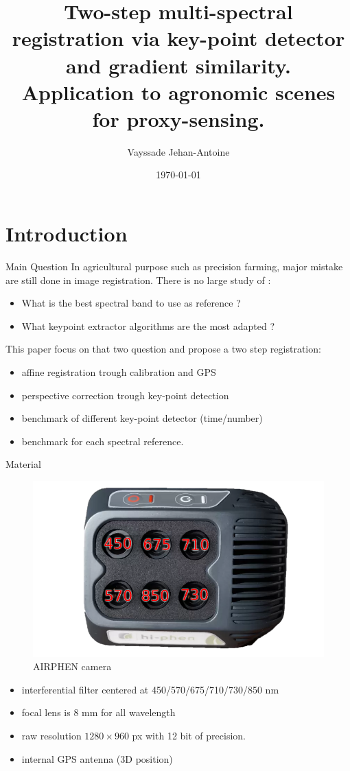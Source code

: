 \documentclass{beamer}
\title{
	Two-step multi-spectral registration via key-point detector and gradient similarity. \\
	\vspace{1em}
	Application to agronomic scenes for proxy-sensing.
}
\date{\today}
\author{Vayssade Jehan-Antoine}
\institute{\url{jehan-antoine.vayssade@inra.fr}}
\begin{document}
	\maketitle
	\section{Introduction}
	
		\begin{frame}{Main Question}
			In agricultural purpose such as precision farming, major mistake are still done in image registration.
			There is no large study of :
			
			\begin{itemize}
				\item What is the best spectral band to use as reference ?
				\item What keypoint extractor algorithms are the most adapted ?
			\end{itemize}
		
			This paper focus on that two question and propose a two step registration:
			
			\begin{itemize}
				\item affine registration trough calibration and GPS
				\item perspective correction trough key-point detection
				\item benchmark of different key-point detector (time/number)
				\item benchmark for each spectral reference.
			\end{itemize}
		\end{frame}
	
		\begin{frame}{Material}
			\begin{figure}
				\includegraphics[width=0.4\linewidth]{../figures/airphen-detail4.png}
				\caption{AIRPHEN camera}
			\end{figure}
			\begin{itemize}
				\item interferential filter centered at 450/570/675/710/730/850 nm
				\item focal lens is 8 mm for all wavelength
				\item raw resolution $1280 \times 960$ px with 12 bit of precision.
				\item internal GPS antenna (3D position)
			\end{itemize}
		\end{frame}
	
\end{document}

